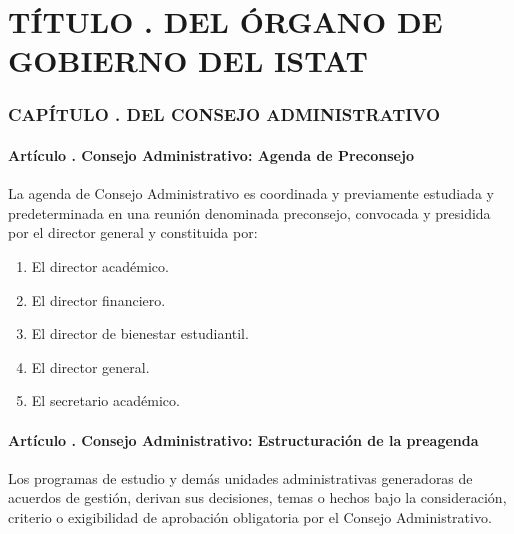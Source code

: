 \part{TÍTULO . DEL ÓRGANO DE GOBIERNO DEL ISTAT}
\addtocounter{ns}{1}
\section{CAPÍTULO . DEL CONSEJO ADMINISTRATIVO}
\addtocounter{ns}{1}

\subsection{Artículo . Consejo Administrativo: Agenda de Preconsejo}
\addtocounter{ns}{1}
La agenda de Consejo Administrativo es coordinada y previamente estudiada y predeterminada en una reunión denominada preconsejo, convocada y presidida por el director general y constituida por:
\begin{enumerate}
\item El director académico. 
\item El director financiero. 
\item El director de bienestar estudiantil. 
\item El director general.  
\item El secretario académico. 

\end{enumerate}
\subsection{Artículo . Consejo Administrativo: Estructuración de la preagenda}
\addtocounter{ns}{1}
Los programas de estudio y demás unidades administrativas generadoras de acuerdos de gestión, derivan sus decisiones, temas o hechos bajo la consideración, criterio o exigibilidad de aprobación obligatoria por el Consejo Administrativo. 

